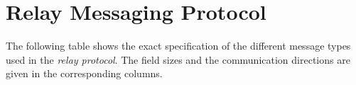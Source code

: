 
\chapter{\label{appendixMessagingProtocol}Relay Messaging Protocol}
The following table shows the exact specification of the different message types used in the \textit{relay protocol}. The field sizes and the communication directions are given in the corresponding columns.

